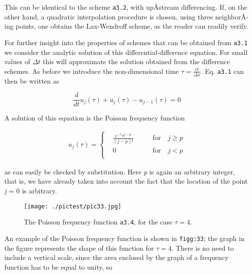 This can be identical to the scheme \texttt{a3.2}, with upÂ­stream
differencing. If, on the other hand, a quadratic interpolation procedure
is chosen, using three neighborÂ­ing points, one obtains the Lax-Wendroff
scheme, as the reader can readily verify.

For further insight into the properties of schemes that can be obtained
from \texttt{a3.1} we consider the analytic solution of this
differential-difference equation. For small values of \(\Delta t\) this
will approximate the solution obtained from the difference schemes. As
before we introduce the non-dimensional time
\(\tau = \frac{\text{ct}}{\Delta x}\). Eq. \texttt{a3.1} can then be
written as

{\[\frac{d}{d t}u_{j}\left( \tau \right) + u_{j}\left( \tau \right) - u_{j - 1}\left( \tau \right) = 0\]}

A solution of this equation is the Poisson frequency function

{\[\begin{aligned}
u_j(\tau) = \left\{ \begin{array}{cc}
&\frac{e^{- \tau}\tau^{j - p}}{(j-p)!} \qquad &\textrm{for} \quad j \geq p \\
& 0  \qquad &\textrm{for} \quad j < p\\
\end{array} \right.
\end{aligned}\]}

as can easily be checked by substitution. Here \emph{p} is again an
arbitrary integer, that is, we have already taken into account the fact
that the location of the point \emph{j} = 0 is arbitrary.

\begin{figure}
\centering
{}
\caption{}
\end{figure}

\begin{figure}
\centering
\texttt{[image: ./pictest/pic33.jpg]}
\caption{The Poisson frequency function \texttt{a3.4}, for the case
\(\tau = 4\).}
\end{figure}

An example of the Poisson frequency function is shown in
\texttt{figg:33}; the graph in the figure represents the shape of this
function for \(\tau = 4\). There is no need to include a vertical scale,
since the area enclosed by the graph of a frequency function has to be
equal to unity, so

